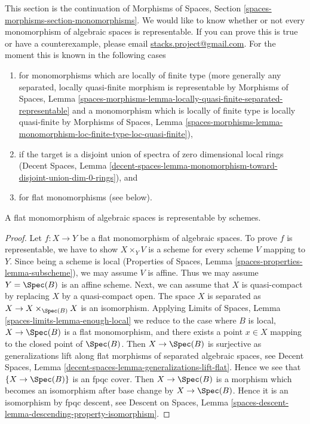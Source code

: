 \noindent
This section is the continuation of
Morphisms of Spaces, Section \ref{spaces-morphisms-section-monomorphisms}.
We would like to know whether or not every monomorphism of algebraic
spaces is representable. If you can prove this is true or have a
counterexample, please email
\href{mailto:stacks.project@gmail.com}{stacks.project@gmail.com}.
For the moment this is known in the following cases
\begin{enumerate}
\item for monomorphisms which are locally of finite type
(more generally any separated, locally quasi-finite morphism
is representable by Morphisms of Spaces, Lemma
\ref{spaces-morphisms-lemma-locally-quasi-finite-separated-representable}
and a monomorphism which is locally of finite type is
locally quasi-finite by Morphisms of Spaces, Lemma
\ref{spaces-morphisms-lemma-monomorphism-loc-finite-type-loc-quasi-finite}),
\item if the target is a disjoint union of spectra of zero dimensional
local rings (Decent Spaces, Lemma
\ref{decent-spaces-lemma-monomorphism-toward-disjoint-union-dim-0-rings}), and
\item for flat monomorphisms (see below).
\end{enumerate}

\begin{lemma}
\label{lemma-flat-case}
A flat monomorphism of algebraic spaces is representable by schemes.
\end{lemma}

\begin{proof}
Let $f : X \to Y$ be a flat monomorphism of algebraic spaces.
To prove $f$ is representable, we have to show
$X \times_Y V$ is a scheme for every scheme $V$ mapping to $Y$.
Since being a scheme is local (Properties of Spaces, 
Lemma \ref{spaces-properties-lemma-subscheme}), we may
assume $V$ is affine. Thus we may assume $Y = \Spec(B)$
is an affine scheme. Next, we can assume that $X$ is quasi-compact
by replacing $X$ by a quasi-compact open. The space $X$ is
separated as $X \to X \times_{\Spec(B)} X$ is an isomorphism.
Applying Limits of Spaces, Lemma \ref{spaces-limits-lemma-enough-local}
we reduce to the case where $B$ is local, $X \to \Spec(B)$ is a
flat monomorphism, and
there exists a point $x \in X$ mapping to the closed point of $\Spec(B)$.
Then $X \to \Spec(B)$ is surjective as generalizations
lift along flat morphisms of separated algebraic spaces, see
Decent Spaces, Lemma \ref{decent-spaces-lemma-generalizations-lift-flat}.
Hence we see that $\{X \to \Spec(B)\}$ is an fpqc cover.
Then $X \to \Spec(B)$ is a morphism which becomes an isomorphism
after base change by $X \to \Spec(B)$. Hence it is an isomorphism by
fpqc descent, see Descent on Spaces, Lemma
\ref{spaces-descent-lemma-descending-property-isomorphism}.
\end{proof}

